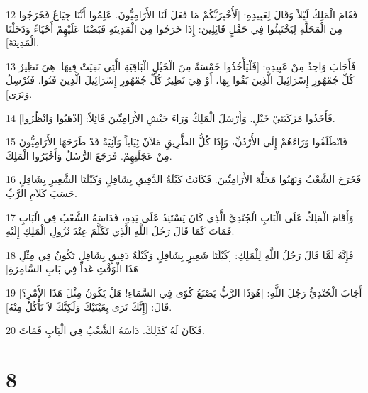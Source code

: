 \par 12 فَقَامَ الْمَلِكُ لَيْلاً وَقَالَ لِعَبِيدِهِ: [لَأُخْبِرَنَّكُمْ مَا فَعَلَ لَنَا الأَرَامِيُّونَ. عَلِمُوا أَنَّنَا جِيَاعٌ فَخَرَجُوا مِنَ الْمَحَلَّةِ لِيَخْتَبِئُوا فِي حَقْلٍ قَائِلِينَ: إِذَا خَرَجُوا مِنَ الْمَدِينَةِ قَبَضْنَا عَلَيْهِمْ أَحْيَاءً وَدَخَلْنَا الْمَدِينَةَ].
\par 13 فَأَجَابَ وَاحِدٌ مِنْ عَبِيدِهِ: [فَلْيَأْخُذُوا خَمْسَةً مِنَ الْخَيْلِ الْبَاقِيَةِ الَّتِي بَقِيَتْ فِيهَا. هِيَ نَظِيرُ كُلِّ جُمْهُورِ إِسْرَائِيلَ الَّذِينَ بَقُوا بِهَا، أَوْ هِيَ نَظِيرُ كُلِّ جُمْهُورِ إِسْرَائِيلَ الَّذِينَ فَنُوا. فَنُرْسِلُ وَنَرَى].
\par 14 فَأَخَذُوا مَرْكَبَتَيْ خَيْلٍ. وَأَرْسَلَ الْمَلِكُ وَرَاءَ جَيْشِ الأَرَامِيِّينَ قَائِلاً: [اذْهَبُوا وَانْظُرُوا].
\par 15 فَانْطَلَقُوا وَرَاءَهُمْ إِلَى الأُرْدُنِّ، وَإِذَا كُلُّ الطَّرِيقِ مَلآنٌ ثِيَاباً وَآنِيَةً قَدْ طَرَحَهَا الأَرَامِيُّونَ مِنْ عَجَلَتِهِمْ. فَرَجَعَ الرُّسُلُ وَأَخْبَرُوا الْمَلِكَ.
\par 16 فَخَرَجَ الشَّعْبُ وَنَهَبُوا مَحَلَّةَ الأَرَامِيِّينَ. فَكَانَتْ كَيْلَةُ الدَّقِيقِ بِشَاقِلٍ وَكَيْلَتَا الشَّعِيرِ بِشَاقِلٍ حَسَبَ كَلاَمِ الرَّبِّ.
\par 17 وَأَقَامَ الْمَلِكُ عَلَى الْبَابِ الْجُنْدِيَّ الَّذِي كَانَ يَسْتَنِدُ عَلَى يَدِهِ، فَدَاسَهُ الشَّعْبُ فِي الْبَابِ فَمَاتَ كَمَا قَالَ رَجُلُ اللَّهِ الَّذِي تَكَلَّمَ عِنْدَ نُزُولِ الْمَلِكِ إِلَيْهِ.
\par 18 فَإِنَّهُ لَمَّا قَالَ رَجُلُ اللَّهِ لِلْمَلِكِ: [كَيْلَتَا شَعِيرٍ بِشَاقِلٍ وَكَيْلَةُ دَقِيقٍ بِشَاقِلٍ تَكُونُ فِي مِثْلِ هَذَا الْوَقْتِ غَداً فِي بَابِ السَّامِرَةِ]
\par 19 أَجَابَ الْجُنْدِيُّ رَجُلَ اللَّهِ: [هُوَذَا الرَّبُّ يَصْنَعُ كُوًى فِي السَّمَاءِ! هَلْ يَكُونُ مِثْلَ هَذَا الأَمْرِ؟] قَالَ: [إِنَّكَ تَرَى بِعَيْنَيْكَ وَلَكِنَّكَ لاَ تَأْكُلُ مِنْهُ].
\par 20 فَكَانَ لَهُ كَذَلِكَ. دَاسَهُ الشَّعْبُ فِي الْبَابِ فَمَاتَ.

\chapter{8}

